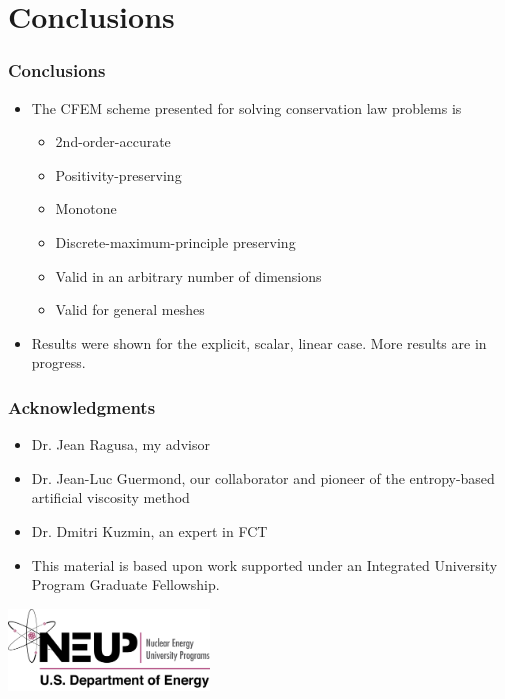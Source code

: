 \documentclass{beamer}
\begin{document}
\section{Conclusions}
\begin{frame}
\frametitle{Conclusions}

\begin{itemize}
   \item The CFEM scheme presented for solving conservation law problems is
   \begin{itemize}
      \item 2nd-order-accurate
      \item Positivity-preserving
      \item Monotone
      \item Discrete-maximum-principle preserving
      \item Valid in an arbitrary number of dimensions
      \item Valid for general meshes
   \end{itemize}
   \item Results were shown for the explicit, scalar, linear case. More results
      are in progress.
\end{itemize}

\end{frame}
\begin{frame}
\frametitle{Acknowledgments}

\begin{itemize}
   \item Dr. Jean Ragusa, my advisor
   \item Dr. Jean-Luc Guermond, our collaborator and pioneer of the entropy-based
      artificial viscosity method
   \item Dr. Dmitri Kuzmin, an expert in FCT
\end{itemize}
\begin{itemize}
   \item This material is based upon work supported under an Integrated University
      Program Graduate Fellowship.
\end{itemize}

\begin{center}
   \includegraphics[width=0.4\textwidth]{./figures/NEUP_Final_Logo_Version-09.jpg}
\end{center}
\end{frame}
\end{document}
